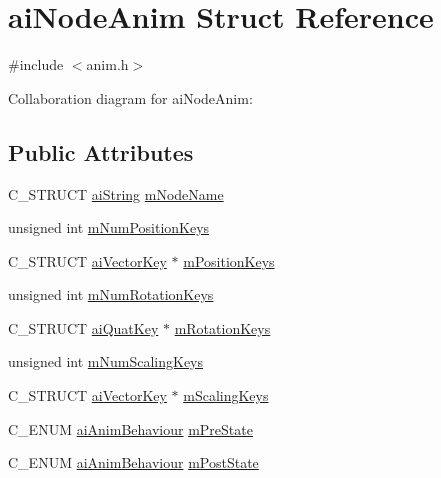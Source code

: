 \hypertarget{structai_node_anim}{\section{ai\-Node\-Anim Struct Reference}
\label{structai_node_anim}
}


{\ttfamily \#include $<$anim.\-h$>$}



Collaboration diagram for ai\-Node\-Anim\-:
\subsection*{Public Attributes}
\begin{DoxyCompactItemize}
\item 
C\-\_\-\-S\-T\-R\-U\-C\-T \hyperlink{structai_string}{ai\-String} \hyperlink{structai_node_anim_a22a591381e75214ba03c6aaa770638f3}{m\-Node\-Name}
\item 
unsigned int \hyperlink{structai_node_anim_aab725313d31db70adab778a3c125103f}{m\-Num\-Position\-Keys}
\item 
C\-\_\-\-S\-T\-R\-U\-C\-T \hyperlink{structai_vector_key}{ai\-Vector\-Key} $\ast$ \hyperlink{structai_node_anim_a983d0db426ac7e5fce442beb19552db3}{m\-Position\-Keys}
\item 
unsigned int \hyperlink{structai_node_anim_aca7c78b89c4c64dcdf7619e105e0708c}{m\-Num\-Rotation\-Keys}
\item 
C\-\_\-\-S\-T\-R\-U\-C\-T \hyperlink{structai_quat_key}{ai\-Quat\-Key} $\ast$ \hyperlink{structai_node_anim_abe1b0b8b0b30a3950cf09023868a07ac}{m\-Rotation\-Keys}
\item 
unsigned int \hyperlink{structai_node_anim_a28fa0fd84571ac79cb45a537192738f6}{m\-Num\-Scaling\-Keys}
\item 
C\-\_\-\-S\-T\-R\-U\-C\-T \hyperlink{structai_vector_key}{ai\-Vector\-Key} $\ast$ \hyperlink{structai_node_anim_a4588122722d5148d6e590da820bdf35f}{m\-Scaling\-Keys}
\item 
C\-\_\-\-E\-N\-U\-M \hyperlink{anim_8h_a201b9e9429b82cd6423ff4a4daf01cef}{ai\-Anim\-Behaviour} \hyperlink{structai_node_anim_a305c01b60886a07b69f04b1db6d7d3c5}{m\-Pre\-State}
\item 
C\-\_\-\-E\-N\-U\-M \hyperlink{anim_8h_a201b9e9429b82cd6423ff4a4daf01cef}{ai\-Anim\-Behaviour} \hyperlink{structai_node_anim_a93cefd440cbaf587c136eb224d4a0327}{m\-Post\-State}
\end{DoxyCompactItemize}


